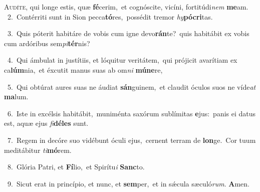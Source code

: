 \lettrine{\initial\textcolor{\initialcolor}{A}}{udíte,} qui longe estis, quæ \textbf{fé}\-cerim,~\star et cognóscite, vicíni, fortitúdi\textit{nem} \textbf{me}\-am.\\
{\numbfont\textcolor{\numbcolor}{~2.}}~Contérriti sunt in Sion pecca\-\textbf{tó}\-res,~\star possédit tremor \textit{hy}\-\textbf{pó}\textbf{cri}tas.\par
{\numbfont\textcolor{\numbcolor}{~3.}}~Quis póterit habitáre de vobis cum igne devo\-\textbf{rán}\-te?~\star quis habitábit ex vobis cum ardóribus sem\-\textit{pi}\-\textbf{tér}nis?\par
{\numbfont\textcolor{\numbcolor}{~4.}}~Qui ámbulat in justítiis, et lóquitur veritátem,~\dagger qui prójicit avarítiam ex ca\-\textbf{lúm}\-nia,~\star et éxcutit manus suas ab om\textit{ni} \textbf{mú}\-\textbf{ne}re,\par
{\numbfont\textcolor{\numbcolor}{~5.}}~Qui obtúrat aures suas ne áudiat \textbf{sán}\-guinem,~\star et claudit óculos suos ne víde\textit{at} \textbf{ma}\-lum.\par
{\numbfont\textcolor{\numbcolor}{~6.}}~Iste in excélsis habitábit,~\dagger muniménta saxórum sublímitas \textbf{e}\-jus:~\star panis ei datus est, aquæ ejus \textit{fi}\-\textbf{dé}\textbf{les} sunt.\par
{\numbfont\textcolor{\numbcolor}{~7.}}~Regem in decóre suo vidébunt óculi ejus,~\dagger cernent terram de \textbf{lon}\-ge.~\star Cor tuum meditábitur \textit{ti}\-\textbf{mó}rem.\par
{\numbfont\textcolor{\numbcolor}{~8.}}~Glória Patri, et \textbf{Fí}\-lio,~\star et Spirítu\textit{i} \textbf{Sanc}\-to.\par
{\numbfont\textcolor{\numbcolor}{~9.}}~Sicut erat in princípio, et nunc, et \textbf{sem}\-per,~\star et in sǽcula sæculó\-\textit{rum}\-. \textbf{A}\-men.\par
